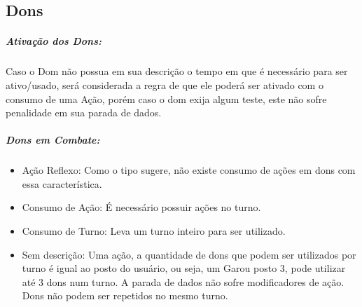 \subsection{\bf Dons}

\subparagraph{\bf Ativação dos Dons:}
Caso o Dom não possua em sua descrição o tempo em que é necessário para ser ativo/usado, será considerada a regra de que ele poderá ser ativado com o consumo de uma Ação, porém caso o dom exija algum teste, este não sofre penalidade em sua parada de dados.

\subparagraph{\bf Dons em Combate:}
\begin{itemize}[noitemsep]
\item Ação Reflexo: Como o tipo sugere, não existe consumo de ações em dons com essa característica.
\item Consumo de Ação: É necessário possuir ações no turno.
\item Consumo de Turno: Leva um turno inteiro para ser utilizado.
\item Sem descrição: Uma ação, a quantidade de dons que podem ser utilizados por turno é igual ao posto do usuário, ou seja, um Garou posto 3, pode utilizar até 3 dons num turno. A parada de dados não sofre modificadores de ação. Dons não podem ser repetidos no mesmo turno.
\end{itemize}